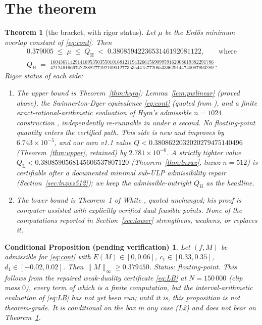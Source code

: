 \documentclass[11pt]{article}
\newtheorem{theorem}{Theorem}
\newtheorem*{conditional}{Conditional Proposition (pending verification)}
\theoremstyle{remark}
\newcommand{\supnorm}[1]{\lVert #1 \rVert_\infty}
\begin{document}
\section{The theorem}\label{sec:theorem}

\begin{theorem}[the bracket, with rigor status]\label{thm:main}
Let $\mu$ be the Erd\H{o}s minimum overlap constant of \eqref{eq:cont}. Then
\begin{gather*}
0.379005 \;\le\; \mu \;\le\; Q_{\mathrm H} \;<\; 0.3808594223653146192081122,
\qquad\text{where}\\[2pt]
Q_{\mathrm H} \;=\;
\frac{160436714291416953503550101681211943266156909959162008619382291786}
     {421249166674228882771921090127735354415772065339629144740087893289}\,.
\end{gather*}
\emph{Rigor status of each side:}
\begin{enumerate}
\item[(U)] The upper bound is Theorem~\ref{thm:hyra}: Lemma~\ref{lem:pwlinear}
(proved above), the Swinnerton-Dyer equivalence \eqref{eq:cont} (quoted from
\cite{Haugland96,White22}), and a finite exact-rational-arithmetic evaluation
of Hyra's admissible $n = 1024$ construction \cite{Arena26}, independently
re-runnable in under a second. No floating-point quantity enters the certified
path. This side is new and improves \cite{Haugland16} by
$6.743\times10^{-5}$, and our own v1.1 value $Q < 0.3808622032020279475140496$
(Theorem~\ref{thm:upper}, retained) by $2.781\times10^{-6}$. A strictly tighter
value $Q_{\mathrm L} < 0.3808590568145606537807120$
(Theorem~\ref{thm:lnzwz}, lnzwz $n = 512$) is certifiable after a documented
minimal sub-ULP admissibility repair (Section~\ref{sec:lnzwz512}); we keep the
admissible-outright $Q_{\mathrm H}$ as the headline.
\item[(L)] The lower bound is Theorem~1 of White \cite{White22}, quoted
unchanged; his proof is computer-assisted with explicitly verified dual
feasible points. None of the computations reported in
Section~\ref{sec:lower} strengthens, weakens, or replaces it.
\end{enumerate}
\end{theorem}

\begin{conditional}
Let $(f, M)$ be admissible for \eqref{eq:cont} with
$E(M) \in [0, 0.06]$, $c_1 \in [0.33, 0.35]$, $d_1 \in [-0.02, 0.02]$. Then
$\supnorm{M} \ge 0.379450$.
\emph{Status: floating-point.} This follows from the repaired weak-duality
certificate \eqref{eq:LB} at $N = 150\,000$ (clip mass $0$), every term of
which is a finite computation, but the interval-arithmetic evaluation of
\eqref{eq:LB} has \emph{not yet been run}; until it is, this proposition is
not theorem-grade. It is conditional on the box in any case (L2) and does
not bear on Theorem~\ref{thm:main}.
\end{conditional}
\end{document}
